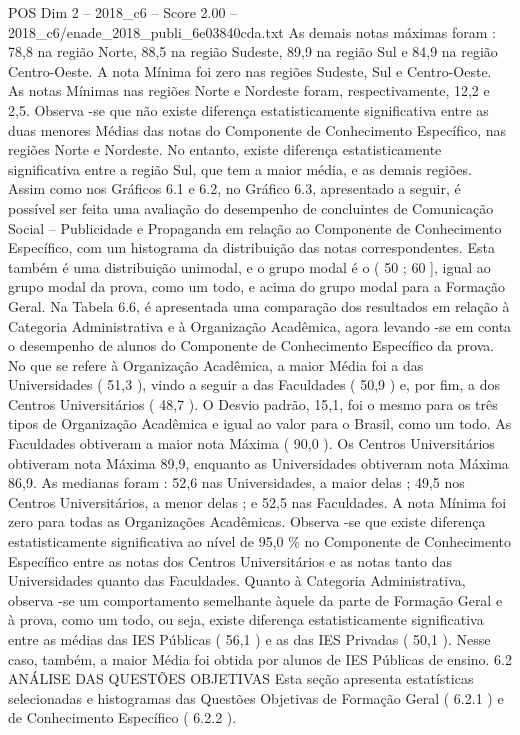 \begin{textsample}{POS Dim 2 – 2018\_c6 – Score 2.00 – 2018\_c6/enade\_2018\_publi\_6e03840cda.txt}
As demais notas máximas foram : 78,8 na região Norte, 88,5 na região Sudeste, 89,9 na região Sul e 84,9 na região Centro-Oeste.
A nota Mínima foi zero nas regiões Sudeste, Sul e Centro-Oeste.
As notas Mínimas nas regiões Norte e Nordeste foram, respectivamente, 12,2 e 2,5.
Observa -se que não existe diferença estatisticamente significativa entre as duas menores Médias das notas do Componente de Conhecimento Específico, nas regiões Norte e Nordeste.
No entanto, existe diferença estatisticamente significativa entre a região Sul, que tem a maior média, e as demais regiões.
Assim como nos Gráficos 6.1 e 6.2, no Gráfico 6.3, apresentado a seguir, é possível ser feita uma avaliação do desempenho de concluintes de Comunicação Social – Publicidade e Propaganda em relação ao Componente de Conhecimento Específico, com um histograma da distribuição das notas correspondentes.
Esta também é uma distribuição unimodal, e o grupo modal é o ( 50 ; 60 ], igual ao grupo modal da prova, como um todo, e acima do grupo modal para a Formação Geral.
Na Tabela 6.6, é apresentada uma comparação dos resultados em relação à Categoria Administrativa e à Organização Acadêmica, agora levando -se em conta o desempenho de alunos do Componente de Conhecimento Específico da prova.
No que se refere à Organização Acadêmica, a maior Média foi a das Universidades ( 51,3 ), vindo a seguir a das Faculdades ( 50,9 ) e, por fim, a dos Centros Universitários ( 48,7 ).
O Desvio padrão, 15,1, foi o mesmo para os três tipos de Organização Acadêmica e igual ao valor para o Brasil, como um todo.
As Faculdades obtiveram a maior nota Máxima ( 90,0 ).
Os Centros Universitários obtiveram nota Máxima 89,9, enquanto as Universidades obtiveram nota Máxima 86,9.
As medianas foram : 52,6 nas Universidades, a maior delas ; 49,5 nos Centros Universitários, a menor delas ; e 52,5 nas Faculdades.
A nota Mínima foi zero para todas as Organizações Acadêmicas.
Observa -se que existe diferença estatisticamente significativa ao nível de 95,0 \% no Componente de Conhecimento Específico entre as notas dos Centros Universitários e as notas tanto das Universidades quanto das Faculdades.
Quanto à Categoria Administrativa, observa -se um comportamento semelhante àquele da parte de Formação Geral e à prova, como um todo, ou seja, existe diferença estatisticamente significativa entre as médias das IES Públicas ( 56,1 ) e as das IES Privadas ( 50,1 ).
Nesse caso, também, a maior Média foi obtida por alunos de IES Públicas de ensino. 6.2 ANÁLISE DAS QUESTÕES OBJETIVAS Esta seção apresenta estatísticas selecionadas e histogramas das Questões Objetivas de Formação Geral ( 6.2.1 ) e de Conhecimento Específico ( 6.2.2 ).

\end{textsample}
